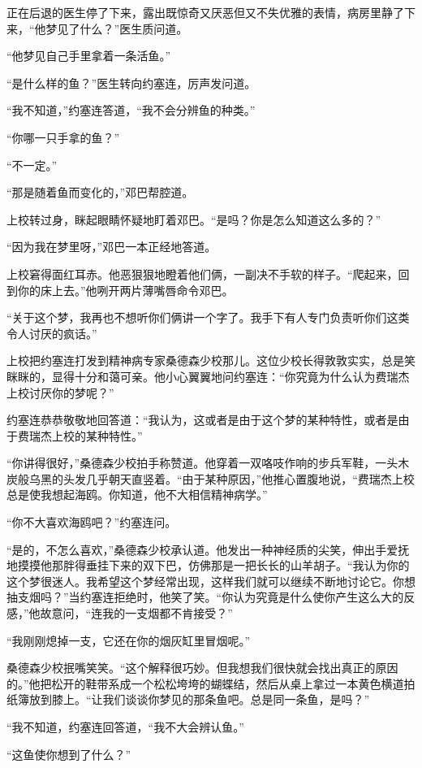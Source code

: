     正在后退的医生停了下来，露出既惊奇又厌恶但又不失优雅的表情，病房里静了下来，“他梦见了什么？”医生质问道。

    “他梦见自己手里拿着一条活鱼。”

    “是什么样的鱼？”医生转向约塞连，厉声发问道。

    “我不知道，”约塞连答道，“我不会分辨鱼的种类。”

    “你哪一只手拿的鱼？”

    “不一定。”

    “那是随着鱼而变化的，”邓巴帮腔道。

    上校转过身，眯起眼睛怀疑地盯着邓巴。“是吗？你是怎么知道这么多的？”

    “因为我在梦里呀，”邓巴一本正经地答道。

    上校窘得面红耳赤。他恶狠狠地瞪着他们俩，一副决不手软的样子。“爬起来，回到你的床上去。”他咧开两片薄嘴唇命令邓巴。

    “关于这个梦，我再也不想听你们俩讲一个字了。我手下有人专门负责听你们这类令人讨厌的疯话。”

    上校把约塞连打发到精神病专家桑德森少校那儿。这位少校长得敦敦实实，总是笑眯眯的，显得十分和蔼可亲。他小心翼翼地问约塞连：“你究竟为什么认为费瑞杰上校讨厌你的梦呢？”

    约塞连恭恭敬敬地回答道：“我认为，这或者是由于这个梦的某种特性，或者是由于费瑞杰上校的某种特性。”

    “你讲得很好，”桑德森少校拍手称赞道。他穿着一双咯吱作响的步兵军鞋，一头木炭般乌黑的头发几乎朝天直竖着。“由于某种原因，”他推心置腹地说，“费瑞杰上校总是使我想起海鸥。你知道，他不大相信精神病学。”

    “你不大喜欢海鸥吧？”约塞连问。

    “是的，不怎么喜欢，”桑德森少校承认道。他发出一种神经质的尖笑，伸出手爱抚地摸摸他那胖得垂挂下来的双下巴，仿佛那是一把长长的山羊胡子。“我认为你的这个梦很迷人。我希望这个梦经常出现，这样我们就可以继续不断地讨论它。你想抽支烟吗？”当约塞连拒绝时，他笑了笑。“你认为究竟是什么使你产生这么大的反感，”他故意问，“连我的一支烟都不肯接受？”

    “我刚刚熄掉一支，它还在你的烟灰缸里冒烟呢。”

    桑德森少校抿嘴笑笑。“这个解释很巧妙。但我想我们很快就会找出真正的原因的。”他把松开的鞋带系成一个松松垮垮的蝴蝶结，然后从桌上拿过一本黄色横道拍纸簿放到膝上。“让我们谈谈你梦见的那条鱼吧。总是同一条鱼，是吗？”

    “我不知道，约塞连回答道，“我不大会辨认鱼。”

    “这鱼使你想到了什么？”

